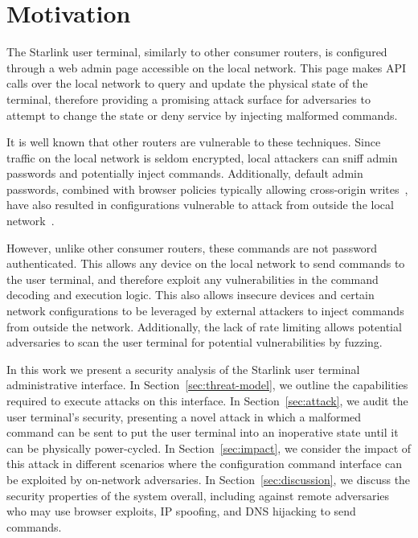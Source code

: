 \section{Motivation}\label{sec:motivation}

The Starlink user terminal, similarly to other consumer routers, is configured through a web admin page accessible on the local network.
This page makes API calls over the local network to query and update the physical state of the terminal, therefore providing a promising attack surface for adversaries to attempt to change the state or deny service by injecting malformed commands.

It is well known that other routers are vulnerable to these techniques.
Since traffic on the local network is seldom encrypted, local attackers can sniff admin passwords and potentially inject commands.
Additionally, default admin passwords, combined with browser policies typically allowing cross-origin writes~\cite{csrf_internal_network,same_origin_policy}, have also resulted in configurations vulnerable to attack from outside the local network~\cite{drive_by_pharming}.

However, unlike other consumer routers, these commands are not password authenticated.
This allows any device on the local network to send commands to the user terminal, and therefore exploit any vulnerabilities in the command decoding and execution logic.
This also allows insecure devices and certain network configurations to be leveraged by external attackers to inject commands from outside the network.
Additionally, the lack of rate limiting allows potential adversaries to scan the user terminal for potential vulnerabilities by fuzzing.

In this work we present a security analysis of the Starlink user terminal administrative interface.
In Section~\ref{sec:threat-model}, we outline the capabilities required to execute attacks on this interface.
In Section~\ref{sec:attack}, we audit the user terminal's security, presenting a novel attack in which a malformed command can be sent to put the user terminal into an inoperative state until it can be physically power-cycled.
In Section~\ref{sec:impact}, we consider the impact of this attack in different scenarios where the configuration command interface can be exploited by on-network adversaries.
In Section~\ref{sec:discussion}, we discuss the security properties of the system overall, including against remote adversaries who may use browser exploits, IP spoofing, and DNS hijacking to send commands.
